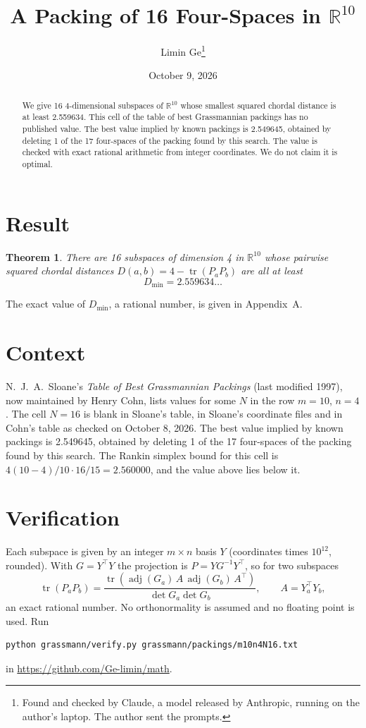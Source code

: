 \documentclass[11pt,a4paper]{article}
\title{A Packing of 16 Four-Spaces in $\mathbb{R}^{10}$}
\author{Limin Ge\thanks{Found and checked by Claude, a model released by Anthropic, running on the author's laptop. The author sent the prompts.}}
\date{October 9, 2026}
\newtheorem*{theorem}{Theorem}
\begin{document}
\maketitle
\begin{abstract}
We give 16 4-dimensional subspaces of $\mathbb{R}^{10}$ whose smallest squared chordal distance is at least 2.559634. This cell of the table of best Grassmannian packings has no published value. The best value implied by known packings is 2.549645, obtained by deleting 1 of the 17 four-spaces of the packing found by this search. The value is checked with exact rational arithmetic from integer coordinates. We do not claim it is optimal.
\end{abstract}

\section{Result}
\begin{theorem}
There are 16 subspaces of dimension 4 in $\mathbb{R}^{10}$ whose pairwise squared chordal distances $D(a,b) = 4 - \operatorname{tr}(P_aP_b)$ are all at least
\[ D_{\min} = 2.559634\ldots \]
\end{theorem}
The exact value of $D_{\min}$, a rational number, is given in Appendix~A.


\section{Context}
N.~J.~A.~Sloane's \emph{Table of Best Grassmannian Packings} (last modified 1997), now maintained by Henry Cohn, lists values for some $N$ in the row $m=10$, $n=4$. The cell $N=16$ is blank in Sloane's table, in Sloane's coordinate files and in Cohn's table as checked on October 8, 2026. The best value implied by known packings is 2.549645, obtained by deleting 1 of the 17 four-spaces of the packing found by this search. The Rankin simplex bound for this cell is $4(10-4)/10\cdot 16/15 = 2.560000$, and the value above lies below it.


\section{Verification}
Each subspace is given by an integer $m\times n$ basis $Y$ (coordinates times $10^{12}$, rounded). With $G=Y^\top Y$ the projection is $P=YG^{-1}Y^\top$, so for two subspaces
\[ \operatorname{tr}(P_aP_b)=\frac{\operatorname{tr}(\operatorname{adj}(G_a)\,A\,\operatorname{adj}(G_b)\,A^\top)}{\det G_a\det G_b},\qquad A=Y_a^\top Y_b, \]
an exact rational number. No orthonormality is assumed and no floating point is used. Run
\begin{verbatim}
python grassmann/verify.py grassmann/packings/m10n4N16.txt
\end{verbatim}
in \url{https://github.com/Ge-limin/math}.
\end{document}
